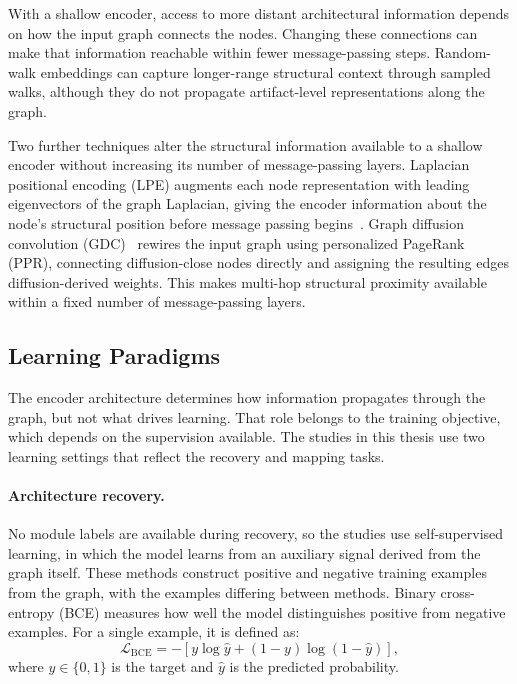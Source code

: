 With a shallow encoder, access to more distant architectural information depends on how the input graph connects the nodes. Changing these connections can make that information reachable within fewer message-passing steps. Random-walk embeddings can capture longer-range structural context through sampled walks, although they do not propagate artifact-level representations along the graph.

Two further techniques alter the structural information available to a shallow encoder without increasing its number of message-passing layers. Laplacian positional encoding (LPE) augments each node representation with leading eigenvectors of the graph Laplacian, giving the encoder information about the node's structural position before message passing begins~\cite{lpe}. Graph diffusion convolution (GDC)~\cite{gdc} rewires the input graph using personalized PageRank (PPR), connecting diffusion-close nodes directly and assigning the resulting edges diffusion-derived weights. This makes multi-hop structural proximity available within a fixed number of message-passing layers.

\subsection{Learning Paradigms \label{sec:bg_learning}}

The encoder architecture determines how information propagates through the graph, but not what drives learning. That role belongs to the training objective, which depends on the supervision available. The studies in this thesis use two learning settings that reflect the recovery and mapping tasks.

\paragraph{Architecture recovery.} No module labels are available during recovery, so the studies use self-supervised learning, in which the model learns from an auxiliary signal derived from the graph itself. These methods construct positive and negative training examples from the graph, with the examples differing between methods. Binary cross-entropy (BCE) measures how well the model distinguishes positive from negative examples. For a single example, it is defined as:
\begin{equation}
    \mathcal{L}_{\mathrm{BCE}} = -\left[y\log\hat{y} + (1-y)\log(1-\hat{y})\right],
    \label{eq:bce}
\end{equation}
where $y \in \{0,1\}$ is the target and $\hat{y}$ is the predicted probability.

